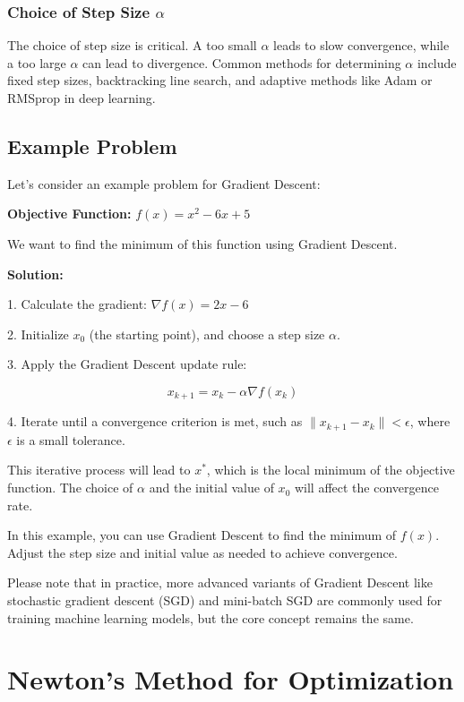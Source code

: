 \documentclass[a4paper]{article}
\begin{document}
\subsubsection{Choice of Step Size $\alpha$}

The choice of step size is critical. A too small $\alpha$ leads to slow convergence, while a too large $\alpha$ can lead to divergence. Common methods for determining $\alpha$ include fixed step sizes, backtracking line search, and adaptive methods like Adam or RMSprop in deep learning.

\subsection{Example Problem}

Let's consider an example problem for Gradient Descent:

\textbf{Objective Function:} $f(x) = x^2 - 6x + 5$

We want to find the minimum of this function using Gradient Descent.

\textbf{Solution:}

1. Calculate the gradient: $\nabla f(x) = 2x - 6$

2. Initialize $x_0$ (the starting point), and choose a step size $\alpha$.

3. Apply the Gradient Descent update rule:

\[
x_{k+1} = x_k - \alpha \nabla f(x_k)
\]

4. Iterate until a convergence criterion is met, such as $\|x_{k+1} - x_k\| < \epsilon$, where $\epsilon$ is a small tolerance.

This iterative process will lead to $x^*$, which is the local minimum of the objective function. The choice of $\alpha$ and the initial value of $x_0$ will affect the convergence rate.

In this example, you can use Gradient Descent to find the minimum of $f(x)$. Adjust the step size and initial value as needed to achieve convergence.

Please note that in practice, more advanced variants of Gradient Descent like stochastic gradient descent (SGD) and mini-batch SGD are commonly used for training machine learning models, but the core concept remains the same.

\section{Newton's Method for Optimization}
\end{document}
